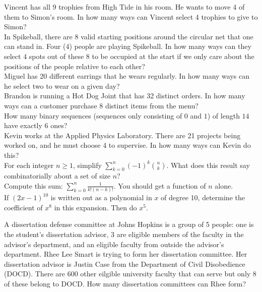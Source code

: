 \documentclass[12pt]{article}
\begin{document}
 Vincent has all 9 trophies from High Tide in his room. He wants to move 4 of them to Simon's room. In how many ways can Vincent select 4 trophies to give to Simon?\\

 In Spikeball, there are 8 valid starting positions around the circular net that one can stand in. Four (4) people are playing Spikeball. In how many ways can they select 4 spots out of these 8 to be occupied at the start if we only care about the positions of the people relative to each other?\\

 Miguel has 20 different earrings that he wears regularly. In how many ways can he select two to wear on a given day?\\

 Brandon is running a Hot Dog Joint that has 32 distinct orders. In how many ways can a customer purchase 8 distinct items from the menu?\\

 How many binary sequences (sequences only consisting of $0$ and $1$) of length $14$ have exactly $6$ ones?\\

 Kevin works at the Applied Physics Laboratory. There are 21 projects being worked on, and he must choose 4 to supervise. In how many ways can Kevin do this?\\


 For each integer $n\ge 1$, simplify $\sum_{k=0}^n (-1)^k{n\choose k}$.  What does this result say combinatorially about a set of size $n$?\\

 Compute this sum: $\displaystyle \sum_{k=0}^n \frac 1{k!(n-k)!}$.  You should get a function of $n$ alone.\\

 If $(2x-1)^{10}$ is written out as a polynomial in $x$ of degree 10, determine the coefficient of $x^{8}$ in this expansion.  Then do $x^{5}$.\\



\newpage




 A dissertation defense committee at Johns Hopkins is a group of 5 people: one is the student's dissertation advisor,
3 are eligible members of the faculty in the advisor's department, and an eligible faculty from outside the advisor's department.
Rhee Lee Smart is trying to form her
dissertation committee. Her dissertation advisor is Justin Case from the Department of Civil Disobedience (DOCD).  There are 600 other eilgible university faculty that can serve but only 8 of these belong to DOCD.  How many dissertation committees can Rhee form?\\
\end{document}
